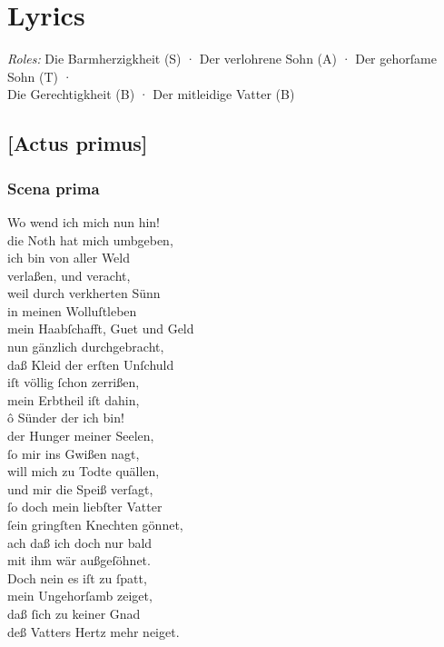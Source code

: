 \documentclass{ees}
\newenvironment{lyrics}[1]{%
  \subsection{#1}\nopagebreak%
  \begin{lyricslist}%
  \let\voice\item%
}{%
  \end{lyricslist}%
}
\newcommand\voiceSohn{\voice[Sohn]}
\begin{document}
\clearscrheadfoot

\chapter{Lyrics}

\textit{Roles:} Die Barmherzigkheit (S) · Der verlohrene Sohn (A) · Der gehorſame Sohn (T) · \\Die Gerechtigkheit (B) · Der mitleidige Vatter (B)

\section{[Actus primus]}

\begin{lyrics}{Scena prima}
  \voiceSohn
  Wo wend ich mich nun hin!\\
  die Noth hat mich umbgeben,\\
  ich bin von aller Weld\\
  verlaßen, und veracht,\\
  weil durch verkherten Sünn\\
  in meinen Wolluſtleben\\
  mein Haabſchafft, Guet und Geld\\
  nun gänzlich durchgebracht,\\
  daß Kleid der erſten Unſchuld\\
  iſt völlig ſchon zerrißen,\\
  mein Erbtheil iſt dahin,\\
  ô Sünder der ich bin!\\
  der Hunger meiner Seelen,\\
  ſo mir ins Gwißen nagt,\\
  will mich zu Todte quällen,\\
  und mir die Speiß verſagt,\\
  ſo doch mein liebſter Vatter\\
  ſein gringſten Knechten gönnet,\\
  ach daß ich doch nur bald\\
  mit ihm wär außgeſöhnet.\\
  Doch nein es iſt zu ſpatt,\\
  mein Ungehorſamb zeiget,\\
  daß ſich zu keiner Gnad\\
  deß Vatters Hertz mehr neiget.
\end{lyrics}
\end{document}
